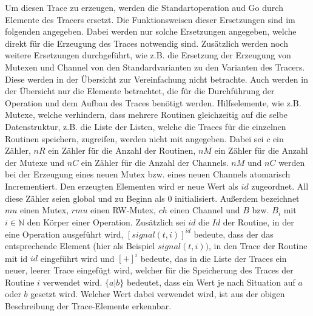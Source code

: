 Um diesen Trace zu erzeugen, werden die Standartoperation aud Go durch Elemente
des Tracers ersetzt. Die Funktionsweisen dieser Ersetzungen sind im folgenden 
angegeben. Dabei werden nur solche Ersetzungen angegeben, welche direkt 
für die Erzeugung
des Traces notwendig sind. Zusätzlich werden noch 
weitere Ersetzungen durchgeführt, wie z.B. die Ersetzung der Erzeugung von 
Mutexen und Channel von den Standardvarianten zu den Varianten des Tracers. 
Diese werden in der Übersicht zur Vereinfachung nicht betrachte. Auch werden 
in der Übersicht nur die Elemente betrachtet, die für die Durchführung der 
Operation und dem Aufbau des Traces benötigt werden. Hilfselemente, wie z.B. 
Mutexe, welche verhindern, dass mehrere Routinen gleichzeitig auf die selbe 
Datenstruktur, 
z.B. die Liste der Listen, welche die Traces für die einzelnen Routinen 
speichern, zugreifen, werden nicht mit angegeben. Dabei sei $c$ ein 
Zähler, $nR$ ein Zähler für die Anzahl der Routinen, $nM$ ein Zähler für die 
Anzahl der Mutexe und $nC$ ein Zähler für die Anzahl der Channels. $nM$ und $nC$
werden bei der Erzeugung eines neuen Mutex bzw. eines neuen Channels atomarisch 
Incrementiert. Den erzeugten Elementen wird er neue Wert als $id$ zugeordnet. All diese 
Zähler seien global und zu Beginn als $0$ initialisiert. Außerdem bezeichnet 
$mu$ einen Mutex, $rmu$ einen RW-Mutex, $ch$ einen Channel und $B$ bzw. $B_i$
mit $i\in\mathbb{N}$ den 
Körper einer Operation. Zusätzlich
sei $id$ die $Id$ der Routine, in der eine Operation ausgeführt wird,
$[signal(t, i)]^{id}$ bedeute, dass der das entsprechende Element (hier als 
Beispiel $signal(t, i))$, in den Trace der Routine mit id $id$ eingeführt wird
und $[+]^i$ bedeute, das in die Liste der Traces ein neuer, leerer Trace 
eingefügt wird, welcher für die Speicherung des Traces der Routine $i$ 
verwendet wird. 
$\{a|b\}$ bedeutet, dass ein Wert je nach Situation auf $a$ oder $b$ gesetzt 
wird. Welcher Wert dabei verwendet wird, ist aus der obigen Beschreibung der 
Trace-Elemente erkennbar.
